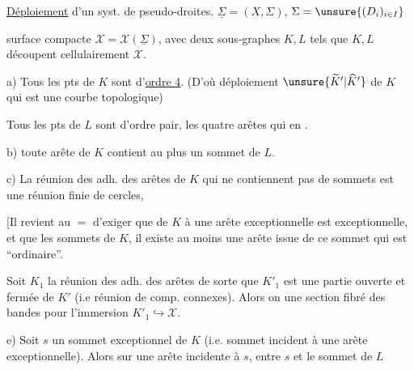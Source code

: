 \uline{Déploiement} d'un syst. de pseudo-droites. $\underline\Sigma=(X,\Sigma)$, $\Sigma=\unsure{(D_i)_{i\in I}}$

surface compacte $\mathcal X=\mathcal X(\underline\Sigma)$, avec deux sous-graphes $K,L$ tels que $K,L$ découpent cellulairement $\mathcal X$.

a) Tous les pts de $K$ sont d'\uline{ordre 4}. (D'où déploiement $\unsure{\widetilde K'|\widehat K'}$ de $K$ qui est une courbe topologique)

 Tous les pts de $L$ sont d'ordre pair, les quatre arêtes qui en  .

b)  toute arête de $K$ contient au plus un sommet de $L$.

c) La réunion  des adh. des arêtes de $K$ qui ne contiennent pas de sommets  est une réunion finie de cercles, 


[Il revient au $=$ d'exiger que  de $K$  à une arête exceptionnelle est exceptionnelle, et que  les sommets de $K$, il existe au moins une arête issue de ce sommet qui  est ``ordinaire''.

 Soit $K_1$ la réunion des adh. des arêtes  de sorte que  $K'_1$ est une  partie ouverte et fermée  de $K'$ (i.e réunion de comp. connexes). Alors on  une section  fibré des bandes pour l'immersion $K'_1\hookrightarrow\mathcal X$.


e) Soit $s$ un sommet exceptionnel de $K$ (i.e. sommet incident à une arête exceptionnelle). Alors sur  une arête    incidente à $s$, entre $s$ et le  sommet de $L$


